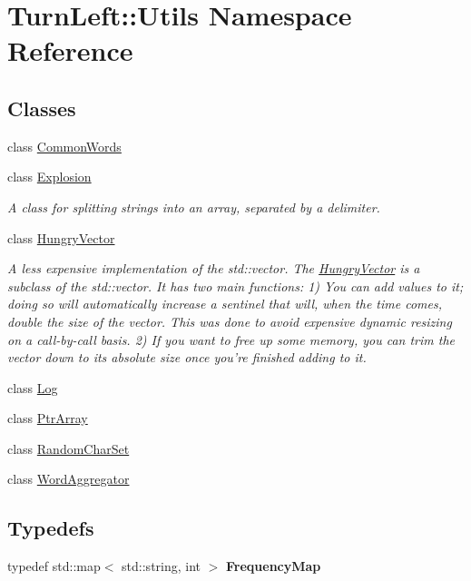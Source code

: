 \hypertarget{namespaceTurnLeft_1_1Utils}{
\section{TurnLeft::Utils Namespace Reference}
\label{namespaceTurnLeft_1_1Utils}
}
\subsection*{Classes}
\begin{DoxyCompactItemize}
\item 
class \hyperlink{classTurnLeft_1_1Utils_1_1CommonWords}{CommonWords}
\item 
class \hyperlink{classTurnLeft_1_1Utils_1_1Explosion}{Explosion}
\begin{DoxyCompactList}\small\item\em A class for splitting strings into an array, separated by a delimiter. \item\end{DoxyCompactList}\item 
class \hyperlink{classTurnLeft_1_1Utils_1_1HungryVector}{HungryVector}
\begin{DoxyCompactList}\small\item\em A less expensive implementation of the std::vector. The \hyperlink{classTurnLeft_1_1Utils_1_1HungryVector}{HungryVector} is a subclass of the std::vector. It has two main functions: 1) You can add values to it; doing so will automatically increase a sentinel that will, when the time comes, double the size of the vector. This was done to avoid expensive dynamic resizing on a call-\/by-\/call basis. 2) If you want to free up some memory, you can trim the vector down to its absolute size once you're finished adding to it. \item\end{DoxyCompactList}\item 
class \hyperlink{classTurnLeft_1_1Utils_1_1Log}{Log}
\item 
class \hyperlink{classTurnLeft_1_1Utils_1_1PtrArray}{PtrArray}
\item 
class \hyperlink{classTurnLeft_1_1Utils_1_1RandomCharSet}{RandomCharSet}
\item 
class \hyperlink{classTurnLeft_1_1Utils_1_1WordAggregator}{WordAggregator}
\end{DoxyCompactItemize}
\subsection*{Typedefs}
\begin{DoxyCompactItemize}
\item 
\hypertarget{namespaceTurnLeft_1_1Utils_a25c509095b780d24d7ce75b2ee309ca0}{
typedef std::map$<$ std::string, int $>$ {\bfseries FrequencyMap}}
\label{namespaceTurnLeft_1_1Utils_a25c509095b780d24d7ce75b2ee309ca0}

\end{DoxyCompactItemize}
